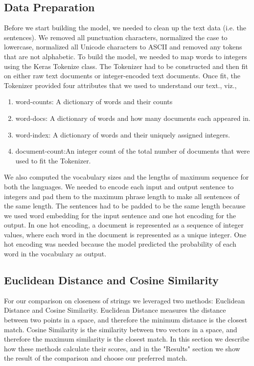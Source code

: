 \documentclass[runningheads]{llncs}
\begin{document}
	\subsection{Data Preparation}
	Before we start building the model, we needed to clean up the text data (i.e. the sentences). We removed all punctuation characters, normalized the case to lowercase, normalized all Unicode characters to ASCII and removed any tokens that are not alphabetic. To build the model, we needed to map words to integers  using the Keras Tokenize class. The Tokenizer had to be constructed and then fit on either raw text documents or integer-encoded text documents. Once fit, the Tokenizer provided four attributes that we used to understand our text., viz.,
					\begin{enumerate}
						 \item word-counts: A dictionary of words and their counts
						 \item word-docs: A dictionary of words and how many documents each appeared in.
						\item word-index: A dictionary of words and their uniquely assigned integers.
						\item document-count:An integer count of the total number of documents that were used to fit the Tokenizer.
					\end{enumerate}
	
	We also computed the vocabulary sizes and the lengths of maximum sequence for both the languages. We needed to encode each input and output sentence to integers and pad them to the maximum phrase length to make all sentences of the same length. The sentences had to be padded to be the same length because we used word embedding for the input sentence and one hot encoding for the output. In one hot encoding, a document is represented as a sequence of integer values, where each word in the document is represented as a unique integer. One hot encoding was needed because the model predicted the probability of each word in the vocabulary as output.	

	\subsection{Euclidean Distance and Cosine Similarity}	
	For our comparison on closeness of strings we leveraged two methods: Euclidean Distance and Cosine Similarity. Euclidean Distance measures the distance between two points in a space, and therefore the minimum distance is the closest match. Cosine Similarity is the similarity between two vectors in a space, and therefore the maximum similarity is the closest match. In this section we describe how these methods calculate their scores, and in the "Results" section we show the result of the comparison and choose our preferred match.
	
\end{document}
